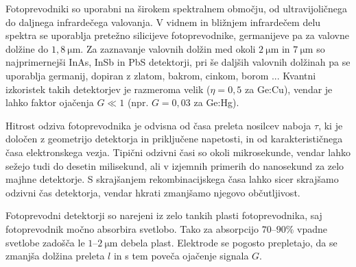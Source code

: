%  

Fotoprevodniki so uporabni na širokem spektralnem območju, od ultra\-vijoličnega
do daljnega infra\-rdečega valovanja. 
V vidnem in bližnjem infrardečem delu spektra se 
uporablja pretežno silicijeve fotoprevodnike, germanijeve
pa za valovne dolžine do $1,8~\si{\micro\meter}$. Za zaznavanje valovnih dolžin med okoli 
$2~\si{\micro\meter}$ in $7~\si{\micro\meter}$ so najprimernejši InAs, InSb in PbS detektorji, 
pri še daljših valovnih dolžinah pa se uporablja germanij, dopiran z zlatom, bakrom, cinkom, borom ...
Kvantni izkoristek takih detektorjev je razmeroma velik ($\eta = 0,5$ za Ge:Cu), vendar
je lahko faktor ojačenja $G \ll 1$ (npr. $G = 0,03$ za Ge:Hg). 

Hitrost odziva fotoprevodnika je odvisna od časa preleta nosilcev naboja $\tau$,
ki je določen z geometrijo detektorja in priključene napetosti, 
in od karakterističnega časa elektronskega vezja. 
Tipični odzivni časi so okoli mikrosekunde, vendar lahko sežejo
tudi do desetin milisekund, ali v izjemnih primerih do nanosekund za zelo majhne detektorje.
S skrajšanjem rekombinacijskega časa lahko sicer skrajšamo odzivni čas detektorja, 
vendar hkrati zmanjšamo njegovo občutljivost.

\begin{remark}
Fotoprevodni detektorji so narejeni iz zelo tankih plasti fotoprevodnika, saj fotoprevodnik močno absorbira
svetlobo. Tako za absorpcijo $70$--$90\%$ vpadne svetlobe zadošča le $1$--$2~\si{\micro\meter}$ debela plast.
Elektrode se pogosto prepletajo, da se zmanjša dolžina preleta $l$ in s tem poveča ojačenje signala $G$. 
\end{remark}

